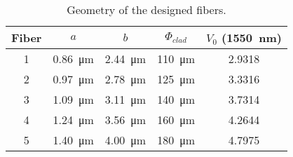 \begin{table}[!t]
\caption[]{Geometry of the designed fibers.}
\label{tab:fibergeom}
\centering
\begin{tabular}{ccccc}
Fiber & $a$ & $b$ & $\Phi_{clad}$ & $V_0$ (\SI{1550}{\nm}) \\
\hline
1 & \SI{0.86}{\um} & \SI{2.44}{\um} & \SI{110}{\um} & 2.9318 \\
2 & \SI{0.97}{\um} & \SI{2.78}{\um} & \SI{125}{\um} & 3.3316 \\
3 & \SI{1.09}{\um} & \SI{3.11}{\um} & \SI{140}{\um} & 3.7314 \\
4 & \SI{1.24}{\um} & \SI{3.56}{\um} & \SI{160}{\um} & 4.2644 \\
5 & \SI{1.40}{\um} & \SI{4.00}{\um} & \SI{180}{\um} & 4.7975 \\
\hline
\end{tabular}
\end{table}
